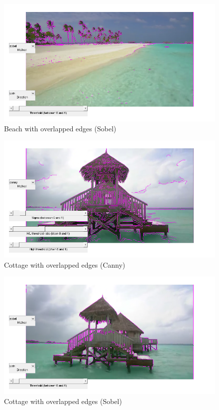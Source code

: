 \begin{figure}[!hbt]
  \includegraphics[width=\textwidth]{./img/ex2/frame_sobel_1.png}
  \caption{Beach with overlapped edges (Sobel)}
  \label{fig:sobelvideobeach}
\end{figure}

\begin{figure}[!hbt]
  \includegraphics[width=\textwidth]{./img/ex2/frame_canny_2.png}
  \caption{Cottage with overlapped edges (Canny)}
  \label{fig:cannyvideocottage}
\end{figure}

\begin{figure}[!hbt]
  \includegraphics[width=\textwidth]{./img/ex2/frame_sobel_2.png}
  \caption{Cottage with overlapped edges (Sobel)}
  \label{fig:sobelvideocottage}
\end{figure}

